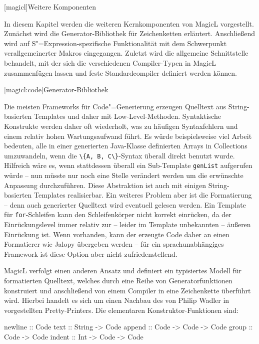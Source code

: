 \documentclass[12pt, a4paper, bibgerm]{scrbook}
\newenvironment{DIFnomarkup}{}{}
\newcommand\icode[1]{\lstinline?#1?}
\newcommand\lchapter{}
\newcommand\lsection{}
\newcommand{\sexp}{S"=Expression}
\newcommand{\cgen}{Code"=Generierung}
\begin{document}
\lchapter[magicl]{Weitere Komponenten}

In diesem Kapitel werden die weiteren Kernkomponenten von MagicL
vorgestellt. Zunächst wird die Generator-Bibliothek für Zeichenketten
erläutert. Anschließend wird auf \sexp{}-spezifische Funktionalität
mit dem Schwerpunkt verallgemeinerter Makros eingegangen. Zuletzt wird
die allgemeine Schnittstelle behandelt, mit der sich die verschiedenen
Compiler-Typen in MagicL zusammenfügen lassen und feste Standardcompiler
definiert werden können.

\lsection[magicl:code]{Generator-Bibliothek}

Die meisten Frameworks für \cgen{} erzeugen Quelltext aus
String-basierten Templates und daher mit
Low-Level-Methoden. Syntaktische Konstrukte werden daher oft wiederholt,
was zu häufigen Syntaxfehlern und einem relativ hohen Wartungsaufwand
führt. Es würde beispielsweise viel Arbeit bedeuten, alle in einer
generierten Java-Klasse definierten Arrays in Collections umzuwandeln,
wenn die \icode{\{A, B, C\}}-Syntax überall direkt benutzt
wurde. Hilfreich wäre es, wenn stattdessen überall ein Sub-Template
\icode{genList} aufgerufen würde -- nun müsste nur noch eine Stelle
verändert werden um die erwünschte Anpassung durchzuführen. Diese
Abstraktion ist auch mit einigen String-basierten Templates
realisierbar. Ein weiteres Problem aber ist die Formatierung -- denn auch
generierter Quelltext wird eventuell gelesen werden. Ein Template für
\icode{for}-Schleifen kann den Schleifenkörper nicht korrekt einrücken,
da der Einrückungslevel immer relativ zur -- leider im Template
unbekannten -- äußeren Einrückung ist.  Wenn vorhanden, kann der erzeugte
Code daher an einen Formatierer wie Jalopy \cite{Jalopy} übergeben werden --
für ein sprachunabhängiges Framework ist diese Option aber nicht
zufriedenstellend.

MagicL verfolgt einen anderen Ansatz und definiert ein typisiertes
Modell für formatierten Quelltext, welches durch eine Reihe von
Generatorfunktionen konstruiert und anschließend von einem Compiler in
eine Zeichenkette überführt wird. Hierbei handelt es sich um einen Nachbau
des von Philip Wadler in \cite[S.223ff]{FunOfProgramming} vorgestellten
Pretty-Printers. Die elementaren Konstruktor-Funktionen sind:
\begin{DIFnomarkup}\begin{code}
newline :: Code
text    :: String -> Code
append  :: Code   -> Code -> Code
group   :: Code   -> Code
indent  :: Int    -> Code -> Code
\end{code}\end{DIFnomarkup}
\end{document}
